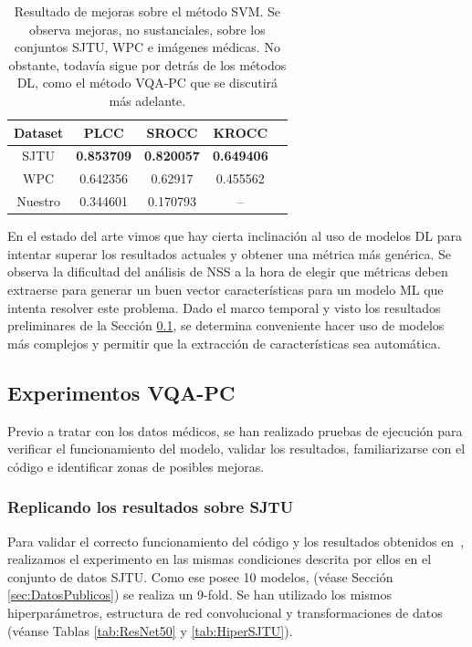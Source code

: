 \begin{table}[htp]
  \scriptsize
  \begin{center}
    \begin{tabular}[c]{|c|c|c|c|c|}
      \hline
      \rowcolor[HTML]{FFC702}
      \textbf{Dataset} & \textbf{PLCC} & \textbf{SROCC} & \textbf{KROCC} \\ 
      \hline
      SJTU & \textbf{0.853709} & \textbf{0.820057} & \textbf{0.649406} \\ 
      \hline 
      WPC & 0.642356 & 0.62917 & 0.455562 \\
      \hline 
      Nuestro & 0.344601 &  0.170793 & -- \\
      \hline
    \end{tabular}
  \end{center}
  \caption[Resultado de mejoras sobre el método SVM.]{Resultado de mejoras sobre el método SVM.
   Se observa mejoras, no sustanciales, sobre los conjuntos SJTU, WPC e imágenes médicas.
   No obstante, todavía sigue por detrás de los métodos DL, como el método VQA-PC 
   que se discutirá más adelante.
  }
  \label{tab:ImprovNR3DQA}
\end{table}

En el estado del arte vimos que hay cierta inclinación al uso de modelos 
DL para intentar superar los resultados actuales y obtener una métrica más 
genérica. Se observa la dificultad del análisis de NSS a la hora de elegir que métricas 
deben extraerse para generar un buen vector características para un modelo ML 
que intenta resolver este problema. Dado el marco temporal y visto los 
resultados preliminares de la Sección \ref{sec:PreResults}, se determina 
conveniente hacer uso de modelos más complejos y permitir que la extracción 
de características sea automática. 

\subsection{Experimentos VQA-PC}
\label{sec:PreResults}
Previo a tratar con los datos médicos, se han realizado pruebas de ejecución 
para verificar el funcionamiento del modelo, validar los resultados, familiarizarse 
con el código e identificar zonas de posibles mejoras.

\subsubsection{Replicando los resultados sobre SJTU}
\label{sec:VQAPCSJTU}
Para validar el correcto funcionamiento del código y los resultados obtenidos 
en~\cite{VQA-PC}, realizamos el experimento en las mismas condiciones descrita 
por ellos en el conjunto de datos SJTU. Como ese posee 10 modelos, 
(véase Sección \ref{sec:DatosPublicos}) se realiza un 9-fold. Se han utilizado 
los mismos hiperparámetros, estructura de red convolucional y transformaciones 
de datos (véanse Tablas \ref{tab:ResNet50} y \ref{tab:HiperSJTU}). 

